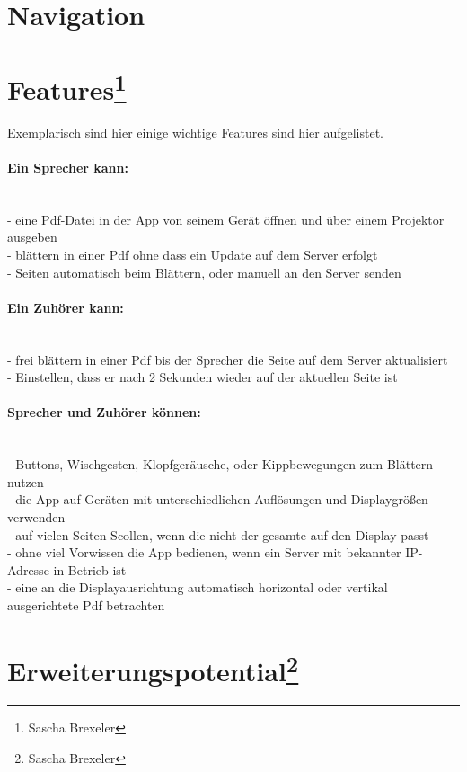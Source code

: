 \newpage

\section{Navigation}




\section[Features]{Features\footnote{Sascha Brexeler}}

Exemplarisch sind hier einige wichtige Features sind hier aufgelistet.

\paragraph{Ein Sprecher kann:}$\;$\\
- eine Pdf-Datei in der App von seinem Gerät öffnen und über einem Projektor ausgeben\\
- blättern in einer Pdf ohne dass ein Update auf dem Server erfolgt\\
- Seiten automatisch beim Blättern, oder manuell an den Server senden
\paragraph{Ein Zuhörer kann:}$\;$\\
- frei blättern in einer Pdf bis der Sprecher die Seite auf dem Server aktualisiert\\
- Einstellen, dass er nach 2 Sekunden wieder auf der aktuellen Seite ist
\paragraph{Sprecher und Zuhörer können:}$\;$\\
- Buttons, Wischgesten, Klopfgeräusche, oder Kippbewegungen zum Blättern nutzen\\
- die App auf Geräten mit unterschiedlichen Auflösungen und Displaygrößen verwenden\\
- auf vielen Seiten Scollen, wenn die nicht der gesamte auf den Display passt\\
- ohne viel Vorwissen die App bedienen, wenn ein Server mit bekannter IP-Adresse in Betrieb ist\\
- eine an die Displayausrichtung automatisch horizontal oder vertikal ausgerichtete Pdf betrachten
\section[Erweiterungspotential]{Erweiterungspotential\footnote{Sascha Brexeler}}

